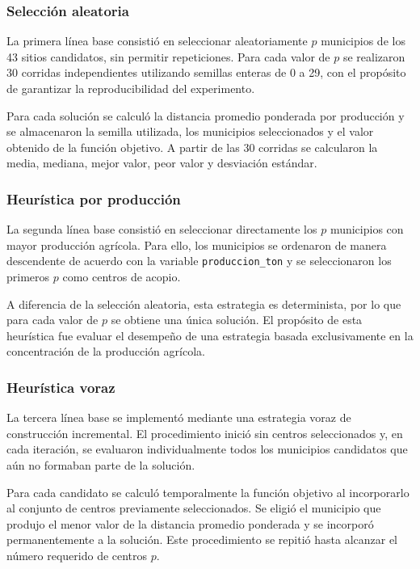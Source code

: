 \documentclass[journal]{IEEEtran}
\begin{document}
\subsubsection{Selección aleatoria}

La primera línea base consistió en seleccionar aleatoriamente $p$ municipios de los 43 sitios candidatos, sin permitir repeticiones. Para cada valor de $p$ se realizaron 30 corridas independientes utilizando semillas enteras de 0 a 29, con el propósito de garantizar la reproducibilidad del experimento.

Para cada solución se calculó la distancia promedio ponderada por producción y se almacenaron la semilla utilizada, los municipios seleccionados y el valor obtenido de la función objetivo. A partir de las 30 corridas se calcularon la media, mediana, mejor valor, peor valor y desviación estándar.

\subsubsection{Heurística por producción}

La segunda línea base consistió en seleccionar directamente los $p$ municipios con mayor producción agrícola. Para ello, los municipios se ordenaron de manera descendente de acuerdo con la variable \texttt{produccion\_ton} y se seleccionaron los primeros $p$ como centros de acopio.

A diferencia de la selección aleatoria, esta estrategia es determinista, por lo que para cada valor de $p$ se obtiene una única solución. El propósito de esta heurística fue evaluar el desempeño de una estrategia basada exclusivamente en la concentración de la producción agrícola.

\subsubsection{Heurística voraz}

La tercera línea base se implementó mediante una estrategia voraz de construcción incremental. El procedimiento inició sin centros seleccionados y, en cada iteración, se evaluaron individualmente todos los municipios candidatos que aún no formaban parte de la solución.

Para cada candidato se calculó temporalmente la función objetivo al incorporarlo al conjunto de centros previamente seleccionados. Se eligió el municipio que produjo el menor valor de la distancia promedio ponderada y se incorporó permanentemente a la solución. Este procedimiento se repitió hasta alcanzar el número requerido de centros $p$.
\end{document}
